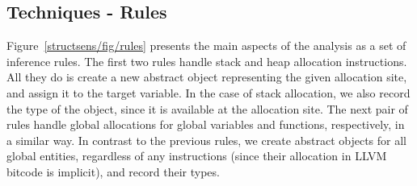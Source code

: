 \subsection{Techniques - Rules}
\label{structsens/sect/rules}

Figure~\ref{structsens/fig/rules} presents the main aspects of the
analysis as a set of inference rules. The first two rules handle stack
and heap allocation instructions. All they do is create a new abstract
object representing the given allocation site, and assign it to the
target variable. In the case of stack allocation, we also record the
type of the object, since it is available at the allocation site. The
next pair of rules handle global allocations for global variables and
functions, respectively, in a similar way. In contrast to the previous
rules, we create abstract objects for all global entities, regardless
of any instructions (since their allocation in LLVM bitcode is
implicit), and record their types.

